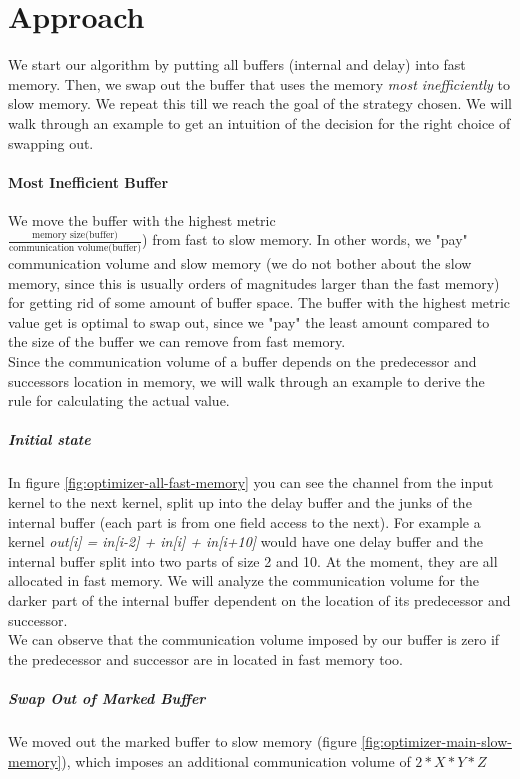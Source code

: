\section{Approach}
We start our algorithm by putting all buffers (internal and delay) into fast memory. Then, we swap out the buffer that uses the memory \textit{most inefficiently} to slow memory. We repeat this till we reach the goal of the strategy chosen. We will walk through an example to get an intuition of the decision for the right choice of swapping out.


\paragraph{Most Inefficient Buffer}
We move the buffer with the highest metric \\ $\frac{\textrm{memory size(buffer)}}{\textrm{communication volume(buffer)}}$) from fast to slow memory. In other words, we "pay" communication volume and slow memory (we do not bother about the slow memory, since this is usually orders of magnitudes larger than the fast memory) for getting rid of some amount of buffer space. The buffer with the highest metric value get is optimal to swap out, since we "pay" the least amount compared to the size of the buffer we can remove from fast memory. \\
Since the communication volume of a buffer depends on the predecessor and successors location in memory, we will walk through an example to derive the rule for calculating the actual value. 


\subparagraph{Initial state}
In figure \ref{fig:optimizer-all-fast-memory} you can see the channel from the input kernel to the next kernel, split up into the delay buffer and the junks of the internal buffer (each part is from one field access to the next). For example a kernel \textit{out[i] = in[i-2] + in[i] + in[i+10]} would have one delay buffer and the internal buffer split into two parts of size 2 and 10. At the moment, they are all allocated in fast memory. We will analyze the communication volume for the darker part of the internal buffer dependent on the location of its predecessor and successor. \\
We can observe that the communication volume imposed by our buffer is zero if the predecessor and successor are in located in fast memory too. 



\subparagraph{Swap Out of Marked Buffer}
We moved out the marked buffer to slow memory (figure \ref{fig:optimizer-main-slow-memory}), which imposes an additional communication volume of $2*X*Y*Z$ 

